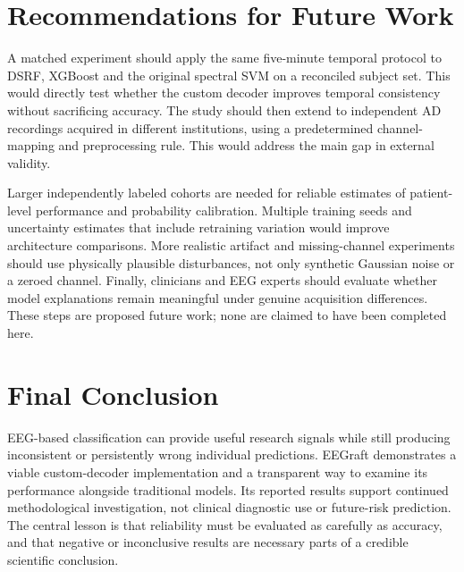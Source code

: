 \section{Recommendations for Future Work}
A matched experiment should apply the same five-minute temporal protocol to DSRF, XGBoost and the original spectral SVM on a reconciled subject set. This would directly test whether the custom decoder improves temporal consistency without sacrificing accuracy. The study should then extend to independent AD recordings acquired in different institutions, using a predetermined channel-mapping and preprocessing rule. This would address the main gap in external validity.

Larger independently labeled cohorts are needed for reliable estimates of patient-level performance and probability calibration. Multiple training seeds and uncertainty estimates that include retraining variation would improve architecture comparisons. More realistic artifact and missing-channel experiments should use physically plausible disturbances, not only synthetic Gaussian noise or a zeroed channel. Finally, clinicians and EEG experts should evaluate whether model explanations remain meaningful under genuine acquisition differences. These steps are proposed future work; none are claimed to have been completed here.

\section{Final Conclusion}
EEG-based classification can provide useful research signals while still producing inconsistent or persistently wrong individual predictions. EEGraft demonstrates a viable custom-decoder implementation and a transparent way to examine its performance alongside traditional models. Its reported results support continued methodological investigation, not clinical diagnostic use or future-risk prediction. The central lesson is that reliability must be evaluated as carefully as accuracy, and that negative or inconclusive results are necessary parts of a credible scientific conclusion.
